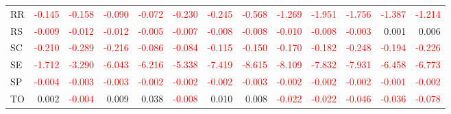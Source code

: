 \begin{table}[!htb]
{\begin{tabular}{lrrrrrrrrrrrr}
      RR & \textcolor{red}{-0.145} & \textcolor{red}{-0.158} & \textcolor{red}{-0.090} & \textcolor{red}{-0.072} & \textcolor{red}{-0.230} & \textcolor{red}{-0.245} & \textcolor{red}{-0.568} & \textcolor{red}{-1.269} & \textcolor{red}{-1.951} & \textcolor{red}{-1.756} & \textcolor{red}{-1.387} & \textcolor{red}{-1.214} \\
      RS & \textcolor{red}{-0.009} & \textcolor{red}{-0.012} & \textcolor{red}{-0.012} & \textcolor{red}{-0.005} & \textcolor{red}{-0.007} & \textcolor{red}{-0.008} & \textcolor{red}{-0.008} & \textcolor{red}{-0.010} & \textcolor{red}{-0.008} & \textcolor{red}{-0.003} & 0.001 & 0.006 \\
      SC & \textcolor{red}{-0.210} & \textcolor{red}{-0.289} & \textcolor{red}{-0.216} & \textcolor{red}{-0.086} & \textcolor{red}{-0.084} & \textcolor{red}{-0.115} & \textcolor{red}{-0.150} & \textcolor{red}{-0.170} & \textcolor{red}{-0.182} & \textcolor{red}{-0.248} & \textcolor{red}{-0.194} & \textcolor{red}{-0.226} \\
      SE & \textcolor{red}{-1.712} & \textcolor{red}{-3.290} & \textcolor{red}{-6.043} & \textcolor{red}{-6.216} & \textcolor{red}{-5.338} & \textcolor{red}{-7.419} & \textcolor{red}{-8.615} & \textcolor{red}{-8.109} & \textcolor{red}{-7.832} & \textcolor{red}{-7.931} & \textcolor{red}{-6.458} & \textcolor{red}{-6.773} \\
      SP & \textcolor{red}{-0.004} & \textcolor{red}{-0.003} & \textcolor{red}{-0.003} & \textcolor{red}{-0.002} & \textcolor{red}{-0.002} & \textcolor{red}{-0.002} & \textcolor{red}{-0.003} & \textcolor{red}{-0.002} & \textcolor{red}{-0.002} & \textcolor{red}{-0.002} & \textcolor{red}{-0.001} & \textcolor{red}{-0.002} \\
      TO & 0.002 & \textcolor{red}{-0.004} & 0.009 & 0.038 & \textcolor{red}{-0.008} & 0.010 & 0.008 & \textcolor{red}{-0.022} & \textcolor{red}{-0.022} & \textcolor{red}{-0.046} & \textcolor{red}{-0.036} & \textcolor{red}{-0.078} \\
      \hline
    \end{tabular}%
  }
  \label{tab:dem_var_sh}
\end{table}
